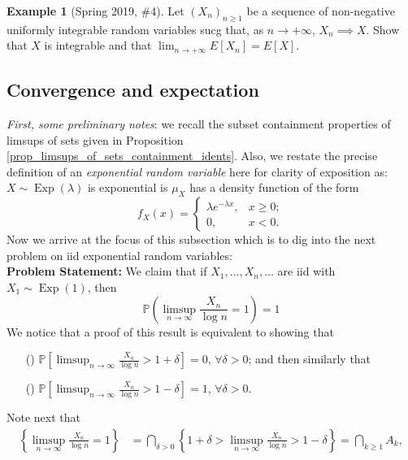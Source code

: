 \documentclass[12pt,reqno]{article}
\renewcommand{\emph}[1]{\textit{#1}}
\theoremstyle{plain}
\theoremstyle{definition}
\newtheorem{example}[theorem]{Example}
\begin{document}
\begin{example}[Spring 2019, \#4]
Let $(X_n)_{n \geq 1}$ be a sequence of non-negative uniformly integrable 
random variables sucg that, as $n \rightarrow +\infty$, $X_n \implies X$. 
Show that $X$ is integrable and that 
$\lim_{n \rightarrow +\infty} E[X_n] = E[X]$. 
\end{example} 

\subsection{Convergence and expectation} 

\emph{First, some preliminary notes}: we recall the subset containment properties of 
limsups of sets given in Proposition \ref{prop_limsups_of_sets_containment_idents}. 
Also, we restate the precise definition of an \emph{exponential random variable} here 
for clarity of exposition as: $X \sim \operatorname{Exp}(\lambda)$ is exponential is 
$\mu_X$ has a density function of the form 
\[
f_X(x) = \begin{cases} 
     \lambda e^{-\lambda x}, & x \geq 0; \\ 
     0, & x < 0.
     \end{cases} 
\]
Now we arrive at the focus of this subsection which is to dig into the 
next problem on iid exponential random variables: \\ 
\textbf{Problem Statement:} 
We claim that if $X_1,\ldots,X_n,\ldots$ are iid with 
$X_1 \sim \operatorname{Exp}(1)$, then 
\[
\mathbb{P}\left(\limsup_{n \rightarrow \infty} \frac{X_n}{\log n} = 1\right) = 1
\]
We notice that a proof of this result is equivalent to showing that 
\begin{itemize} 

\item[(\faLinux)] $\mathbb{P}\left[\limsup_{n \rightarrow \infty} \frac{X_n}{\log n} > 
     1 + \delta\right] = 0$, $\forall \delta > 0$; and then similarly that 
\item[(\faCoffee)] $\mathbb{P}\left[\limsup_{n \rightarrow \infty} 
     \frac{X_n}{\log n} > 1 - \delta\right] = 1$, $\forall \delta > 0$. 

\end{itemize} 
Note next that 
\begin{align*} 
\left\{\limsup_{n \rightarrow \infty} \frac{X_n}{\log n} = 1\right\} & = \bigcap_{\delta > 0} 
     \left\{1 + \delta > \limsup_{n \rightarrow \infty} \frac{X_n}{\log n} > 1 - \delta\right\} = 
     \bigcap_{k \geq 1} A_k, 
\end{align*} 
\end{document}
